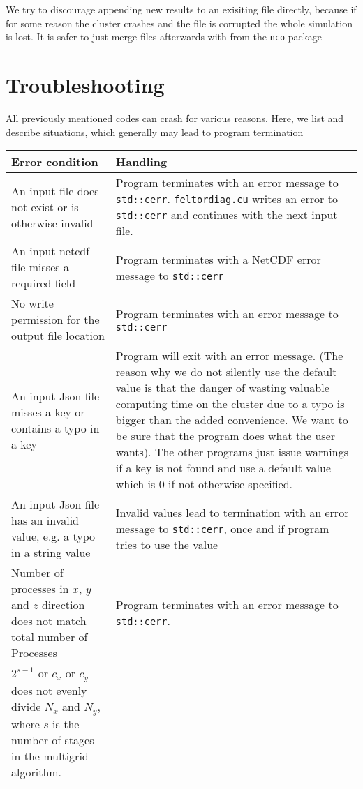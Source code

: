 \begin{tcolorbox}[title=Note]
We try to discourage
appending new results to an exisiting file directly, because if for some reason
the cluster crashes and the file is corrupted the whole simulation is lost.
It is safer to just merge files afterwards with
from the \texttt{nco} package
\end{tcolorbox}
\section{Troubleshooting}
All previously mentioned codes can crash for various reasons. Here,
we list and describe situations, which generally may lead to program
termination
\begin{longtable}{p{6cm}p{8cm}}
\toprule
\rowcolor{gray!50}\textbf{Error condition} &  \textbf{Handling} \\ \midrule
An input file does not exist or is otherwise invalid
&
Program terminates with an error message to \texttt{std::cerr}. \texttt{feltordiag.cu} writes an error to \texttt{std::cerr} and continues with the next input file.
    \\
An input netcdf file misses a required field
&
Program terminates with a NetCDF error message to \texttt{std::cerr}
    \\
No write permission for the output file location
&
Program terminates with an error message to \texttt{std::cerr}
    \\
An input Json file misses a key or contains a typo in a key
&
Program will exit with an error message. (The reason why we do not
silently use the default value is that the danger of wasting
valuable computing time on the cluster due to a typo is bigger than the
added convenience. We want to be sure that the program
does what the user wants).
The other programs just issue warnings
if a key is not found and use a default value
which is $0$ if not otherwise specified.
    \\
    An input Json file has an invalid value, e.g. a typo in a string value
&
Invalid values lead to termination with an error message to \texttt{std::cerr}, once and if program tries to use the value
    \\
    Number of processes in $x$, $y$ and $z$ direction does not match total number of Processes
&
Program terminates with an error message to \texttt{std::cerr}.
    \\
    $2^{s-1}$ or $c_x$ or $c_y$ does not evenly divide $N_x$ and $N_y$, where $s$ is the number of stages in the multigrid algorithm.

\end{longtable}
